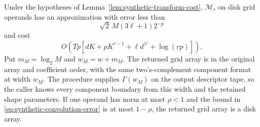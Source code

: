 \begin{proposition}
\label{prop:synthetic-convolution}
Under the hypotheses of Lemma~\ref{lem:synthetic-transform-cost},
$\mathcal M_r$ on disk grid operands has an approximation with error
less than
\begin{equation}
       \sqrt2\,M(3\ell+1)2^{-p}
 \label{eq:synthetic-convolution-error}
\end{equation}
and cost
\[
O\left(Tp\left[dK+pK^{\tau-1}+\ell d^{\lambda'}
                    +\log(rp)\right]\right).
\]
Put $m_M=\log_2M$ and $w_M=w+m_M$. The returned grid array is in the
original array and coefficient order, with the same two's-complement
component format at width $w_M$. The procedure supplies
$\Gamma(w_M)$ on the output descriptor tape, so the caller knows every
component boundary from this width and the retained shape parameters.
If one operand has norm at most $\rho<1$ and the bound in
\eqref{eq:synthetic-convolution-error} is at most $1-\rho$, the
returned grid array is a disk array.
\end{proposition}
